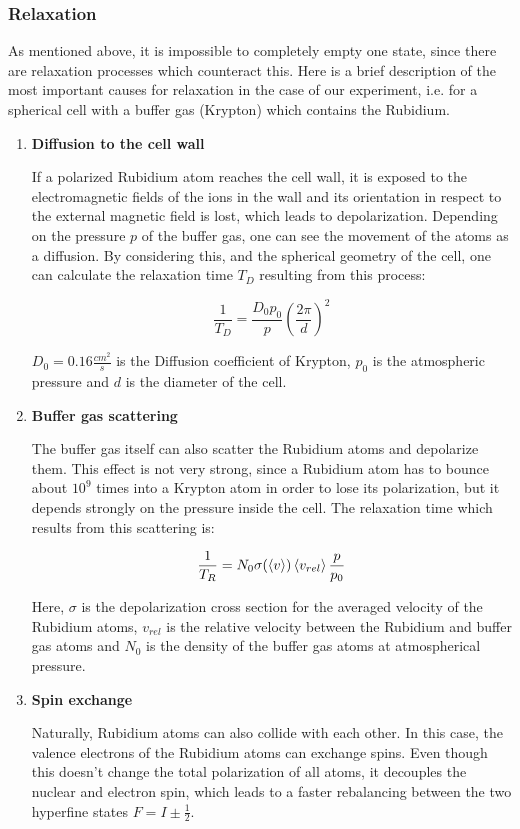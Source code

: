 \subsubsection{Relaxation}
\label{sec:relax}

As mentioned above, it is impossible to completely empty one state, since there are relaxation processes which counteract this. Here is a brief description of the most important causes for relaxation in the case of our experiment, i.e. for a spherical cell with a buffer gas (Krypton) which contains the Rubidium. 

\begin{enumerate}
\item \textbf{Diffusion to the cell wall}

	If a polarized Rubidium atom reaches the cell wall, it is exposed to the electromagnetic fields of the ions in 	the wall and its orientation in respect to the external magnetic field is lost, which leads to depolarization.		Depending on the pressure $p$ of the buffer gas, one can see the movement of the atoms as a diffusion. By 	considering this, and the spherical geometry of the cell, one can calculate the relaxation time $T_D$ 		resulting from this process:
	
	$$ \frac{1}{T_D} = \frac{D_0p_0}{p} \left(\frac{2\pi}{d}\right)^2 $$
	
	$D_0 = 0.16 \frac{cm^2}{s}$ is the Diffusion coefficient of Krypton, $p_0$ is the atmospheric pressure and $d	$ is the diameter of the cell.
	
\item \textbf{Buffer gas scattering}

	The buffer gas itself can also scatter the Rubidium atoms and depolarize them. This effect is not very strong, 	since a Rubidium atom has to bounce about $10^9$ times into a Krypton atom in order to lose its 			polarization, but it depends strongly on the pressure inside the cell. The relaxation time which results from 	this scattering is:
	
	$$ \frac{1}{T_R} = N_0\sigma(\braket{v})\braket{v_{rel}}\frac{p}{p_0} $$
	
	Here, $\sigma$ is the depolarization cross section for the averaged velocity of the Rubidium atoms, $v_{rel}$ 	is the relative velocity between the Rubidium and buffer gas atoms and $N_0$ is the density of the buffer 	gas atoms at atmospherical pressure.

\item \textbf{Spin exchange}

	Naturally, Rubidium atoms can also collide with each other. In this case, the valence electrons of the 		Rubidium atoms can exchange spins. Even though this doesn't change the total polarization of all atoms, it 	decouples the nuclear and electron spin, which leads to a faster rebalancing between the two hyperfine 	states $F = I \pm \frac{1}{2}$.

\end{enumerate}

\clearpage






















